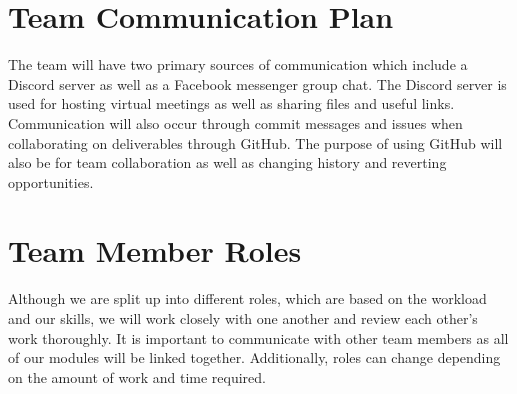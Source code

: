 \documentclass[12pt, titlepage]{article}
\begin{document}
\section{Team Communication Plan}
The team will have two primary sources of communication which include a Discord server as well as a Facebook messenger group chat. The Discord server is used for hosting virtual meetings as well as sharing files and useful links. Communication will also occur through commit messages and issues when collaborating on deliverables through GitHub. The purpose of using GitHub will also be for team collaboration as well as changing history and reverting opportunities. 

\section{Team Member Roles}
Although we are split up into different roles, which are based on the workload and our skills, we will work closely with one another and review each other's work thoroughly. It is important to communicate with other team members as all of our modules will be linked together. Additionally, roles can change depending on the amount of work and time required. 
\end{document}
